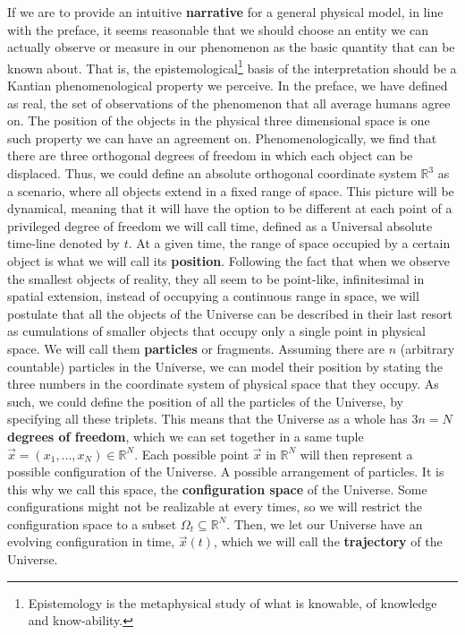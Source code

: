 \documentclass[11pt, a4paper]{article} %
\newcommand{\R}{\mathbb{R}} %
\begin{document}
If we are to provide an intuitive {\bf narrative} for a general physical model, in line with the preface, it seems reasonable that we should choose an entity we can actually observe or measure in our phenomenon as the basic quantity that can be known about. That is, the epistemological\footnote{Epistemology is the metaphysical study of what is knowable, of knowledge and know-ability.} basis of the interpretation should be a Kantian phenomenological property we perceive. In the preface, we have defined as real, the set of observations of the phenomenon that all average humans agree on. The position of the objects in the physical three dimensional space is one such property we can have an agreement on. Phenomenologically, we find that there are three orthogonal degrees of freedom in which each object can be displaced. Thus, we could define an absolute orthogonal coordinate system $\R^3$ as a scenario, where all objects extend in a fixed range of space. This picture will be dynamical, meaning that it will have the option to be different at each point of a privileged degree of freedom we will call time, defined as a Universal absolute time-line denoted by $t$. At a given time, the range of space occupied by a certain object is what we will call its {\bf position}. Following the fact that when we observe the smallest objects of reality, they all seem to be point-like, infinitesimal in spatial extension, instead of occupying a continuous range in space, we will postulate that all the objects of the Universe can be described in their last resort as cumulations of smaller objects that occupy only a single point in physical space. We will call them {\bf particles} or fragments. Assuming there are $n$ (arbitrary countable) particles in the Universe, we can model their position by stating the three numbers in the coordinate system of physical space that they occupy. As such, we could define the position of all the particles of the Universe, by specifying all these triplets. This means that the Universe as a whole has $3n=N$ {\bf degrees of freedom}, which we can set together in a same tuple $\vec{x}=(x_1,...,x_N)\in \R^N$. Each possible point $\vec{x}$ in $\R^N$ will then represent a possible configuration of the Universe. A possible arrangement of particles. It is this why we call this space, the {\bf configuration space} of the Universe. Some configurations might not be realizable at every times, so we will restrict the configuration space to a subset $\Omega_t\subseteq \R^N$. Then, we let our Universe have an evolving configuration in time, $\vec{x}(t)$, which we will call the {\bf trajectory} of the Universe.
\end{document}
